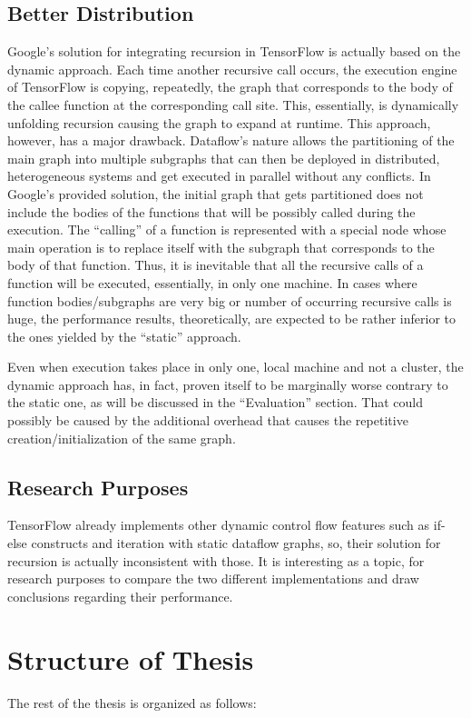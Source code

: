 \documentclass[ack,preface]{dithesis}
\begin{document}
    \subsection{Better Distribution}
 Google's solution for integrating recursion in TensorFlow is actually based on the dynamic approach. Each time another recursive call occurs, the execution engine of TensorFlow is  copying, repeatedly, the graph that corresponds to the body of the callee function at the corresponding call site. This, essentially, is dynamically unfolding recursion causing the graph to expand at runtime. This approach, however, has a major drawback. Dataflow’s nature allows the partitioning of the main graph into multiple subgraphs that can then be deployed in distributed, heterogeneous systems and get executed in parallel without any conflicts. In Google’s provided solution, the initial graph that gets partitioned does not include the bodies of the functions that will be possibly called during the execution. The “calling” of a function is represented with a special node whose main operation is to replace itself with the subgraph that corresponds to the body of that function. Thus, it is inevitable that all the recursive calls of a function will be executed, essentially, in only one machine.  In cases where function bodies/subgraphs are very big or number of occurring recursive calls is huge, the performance results, theoretically, are expected to be rather inferior to the ones yielded by the “static” approach.

Even when execution takes place in only one, local machine and not a cluster, the dynamic approach has, in fact, proven itself to be marginally worse contrary to the static one, as will be discussed in the “Evaluation” section. That could possibly be caused by the additional overhead that causes the repetitive creation/initialization of the same graph.


    \subsection{Research Purposes}
	TensorFlow already implements other dynamic control flow features such as if-else constructs and iteration with static dataflow graphs, so, their solution for recursion is actually inconsistent with those. It is interesting as a topic, for research purposes to compare the two different implementations and draw conclusions regarding their performance. 

    \section{Structure of Thesis}
The rest of the thesis is organized as follows:
\end{document}
